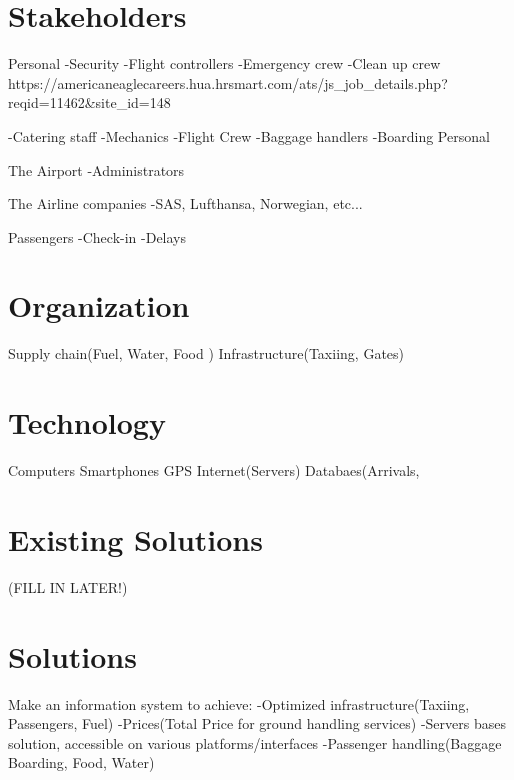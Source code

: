 \section{Stakeholders} 
\label{Stakeholders}

Personal
	-Security
	-Flight controllers
	-Emergency crew
	-Clean up crew
	https://americaneaglecareers.hua.hrsmart.com/ats/js_job_details.php?reqid=11462&site_id=148
	
	-Catering staff
	-Mechanics
	-Flight Crew
	-Baggage handlers
	-Boarding Personal
	
The Airport
	-Administrators

The Airline companies
	-SAS, Lufthansa, Norwegian, etc...
	
Passengers
	-Check-in
	-Delays
		
\section{Organization}
\label{Organization}
Supply chain(Fuel, Water, Food )	
Infrastructure(Taxiing, Gates)

	
\section{Technology}
\label{Technology}
Computers
Smartphones
GPS
Internet(Servers)
Databaes(Arrivals, 

\section{Existing Solutions}
\label{Existing Solutions}
(FILL IN LATER!)

\section{Solutions}
\label{Solutons}
Make an information system to achieve:
	-Optimized infrastructure(Taxiing, Passengers, Fuel)
	-Prices(Total Price for ground handling services)
	-Servers bases solution, accessible on various platforms/interfaces
	-Passenger handling(Baggage Boarding, Food, Water)